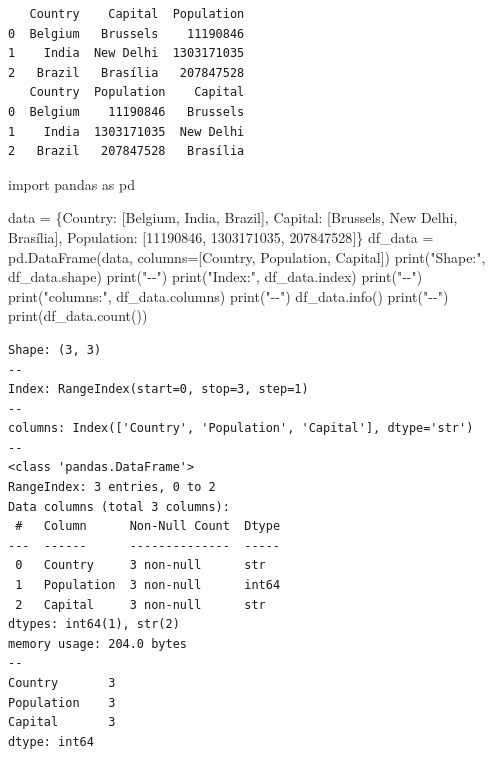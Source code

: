 \documentclass[
  english,
  letterpaper,
  DIV=11,
  numbers=noendperiod]{scrreprt}
\newenvironment{Shaded}{\begin{snugshade}}{\end{snugshade}}
\newcommand{\BuiltInTok}[1]{\textcolor[rgb]{0.00,0.23,0.31}{#1}}
\newcommand{\DecValTok}[1]{\textcolor[rgb]{0.68,0.00,0.00}{#1}}
\newcommand{\ImportTok}[1]{\textcolor[rgb]{0.00,0.46,0.62}{#1}}
\newcommand{\NormalTok}[1]{\textcolor[rgb]{0.00,0.23,0.31}{#1}}
\newcommand{\OperatorTok}[1]{\textcolor[rgb]{0.37,0.37,0.37}{#1}}
\newcommand{\StringTok}[1]{\textcolor[rgb]{0.13,0.47,0.30}{#1}}
\begin{document}
\begin{verbatim}
   Country    Capital  Population
0  Belgium   Brussels    11190846
1    India  New Delhi  1303171035
2   Brazil   Brasília   207847528
   Country  Population    Capital
0  Belgium    11190846   Brussels
1    India  1303171035  New Delhi
2   Brazil   207847528   Brasília
\end{verbatim}

\begin{Shaded}
\begin{Highlighting}[]
\ImportTok{import}\NormalTok{ pandas }\ImportTok{as}\NormalTok{ pd}

\NormalTok{data }\OperatorTok{=}\NormalTok{ \{}\StringTok{\textquotesingle{}Country\textquotesingle{}}\NormalTok{: [}\StringTok{\textquotesingle{}Belgium\textquotesingle{}}\NormalTok{, }\StringTok{\textquotesingle{}India\textquotesingle{}}\NormalTok{, }\StringTok{\textquotesingle{}Brazil\textquotesingle{}}\NormalTok{],}
        \StringTok{\textquotesingle{}Capital\textquotesingle{}}\NormalTok{: [}\StringTok{\textquotesingle{}Brussels\textquotesingle{}}\NormalTok{, }\StringTok{\textquotesingle{}New Delhi\textquotesingle{}}\NormalTok{, }\StringTok{\textquotesingle{}Brasília\textquotesingle{}}\NormalTok{],}
        \StringTok{\textquotesingle{}Population\textquotesingle{}}\NormalTok{: [}\DecValTok{11190846}\NormalTok{, }\DecValTok{1303171035}\NormalTok{, }\DecValTok{207847528}\NormalTok{]\}}
\NormalTok{df\_data }\OperatorTok{=}\NormalTok{ pd.DataFrame(data, columns}\OperatorTok{=}\NormalTok{[}\StringTok{\textquotesingle{}Country\textquotesingle{}}\NormalTok{, }\StringTok{\textquotesingle{}Population\textquotesingle{}}\NormalTok{, }\StringTok{\textquotesingle{}Capital\textquotesingle{}}\NormalTok{])}
\BuiltInTok{print}\NormalTok{(}\StringTok{"Shape:"}\NormalTok{, df\_data.shape)}
\BuiltInTok{print}\NormalTok{(}\StringTok{"{-}{-}"}\NormalTok{)}
\BuiltInTok{print}\NormalTok{(}\StringTok{"Index:"}\NormalTok{, df\_data.index)}
\BuiltInTok{print}\NormalTok{(}\StringTok{"{-}{-}"}\NormalTok{)}
\BuiltInTok{print}\NormalTok{(}\StringTok{"columns:"}\NormalTok{, df\_data.columns)}
\BuiltInTok{print}\NormalTok{(}\StringTok{"{-}{-}"}\NormalTok{)}
\NormalTok{df\_data.info()}
\BuiltInTok{print}\NormalTok{(}\StringTok{"{-}{-}"}\NormalTok{)}
\BuiltInTok{print}\NormalTok{(df\_data.count())}
\end{Highlighting}
\end{Shaded}

\begin{verbatim}
Shape: (3, 3)
--
Index: RangeIndex(start=0, stop=3, step=1)
--
columns: Index(['Country', 'Population', 'Capital'], dtype='str')
--
<class 'pandas.DataFrame'>
RangeIndex: 3 entries, 0 to 2
Data columns (total 3 columns):
 #   Column      Non-Null Count  Dtype
---  ------      --------------  -----
 0   Country     3 non-null      str  
 1   Population  3 non-null      int64
 2   Capital     3 non-null      str  
dtypes: int64(1), str(2)
memory usage: 204.0 bytes
--
Country       3
Population    3
Capital       3
dtype: int64
\end{verbatim}
\end{document}
